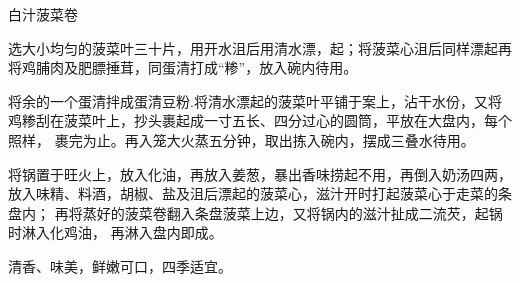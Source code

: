 \begin{recipe}{白汁菠菜卷}

\ingredients


\preparation

\step 选大小均匀的菠菜叶三十片，用开水沮后用清水漂，起；将菠菜心沮后同样漂起再
将鸡脯肉及肥膘捶茸，同蛋清打成“糁”，放入碗内待用。

\step 将余的一个蛋清拌成蛋清豆粉.将清水漂起的菠菜叶平铺于案上，沾干水份，又将
鸡糁刮在菠菜叶上，抄头裹起成一寸五长、四分过心的圆筒，平放在大盘内，每个照样，
裹完为止。再入笼大火蒸五分钟，取出拣入碗内，摆成三叠水待用。

\step 将锅置于旺火上，放入化油，再放入姜葱，暴出香味捞起不用，再倒入奶汤四两，
放入味精、料酒，胡椒、盐及沮后漂起的菠菜心，滋汁开时打起菠菜心于走菜的条盘内；
再将蒸好的菠菜卷翻入条盘菠菜上边，又将锅内的滋汁扯成二流芡，起锅时淋入化鸡油，
再淋入盘内即成。

\features

清香、味美，鲜嫩可口，四季适宜。

\end{recipe}


